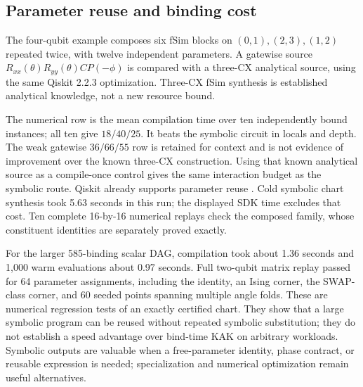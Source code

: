 \documentclass[11pt]{article}
\begin{document}
\subsection{Parameter reuse and binding cost}
The four-qubit example composes six fSim blocks on $(0,1),(2,3),(1,2)$
repeated twice, with twelve independent parameters. A gatewise source
$R_{xx}(\theta)R_{yy}(\theta)CP(-\phi)$ is compared with a three-CX
analytical source, using the same Qiskit 2.2.3 optimization. Three-CX fSim synthesis
is established analytical knowledge, not a new resource bound.

The numerical row is the mean compilation time over ten independently
bound instances; all ten give $18/40/25$. It beats the symbolic circuit in
locals and depth. The weak gatewise $36/66/55$ row is retained for context
and is not evidence of improvement over the known three-CX construction.
Using that known analytical source as a compile-once control gives the same
interaction budget as the symbolic route. Qiskit already supports parameter
reuse \cite{qiskitparameter}. Cold symbolic chart synthesis took 5.63 seconds
in this run; the displayed SDK time excludes that cost. Ten complete
16-by-16 numerical replays check the composed family, whose constituent
identities are separately proved exactly.

For the larger 585-binding scalar DAG, compilation took about 1.36 seconds
and 1,000 warm evaluations about 0.97 seconds. Full two-qubit matrix replay
passed for 64 parameter assignments, including the identity, an Ising corner,
the SWAP-class corner, and 60 seeded points spanning multiple angle folds.
These are numerical regression tests of an exactly certified chart. They
show that a large symbolic program can be reused without repeated symbolic
substitution; they do not establish a speed advantage over bind-time KAK
on arbitrary workloads. Symbolic outputs are valuable when a free-parameter
identity, phase contract, or reusable expression is needed; specialization
and numerical optimization remain useful alternatives.
\end{document}
